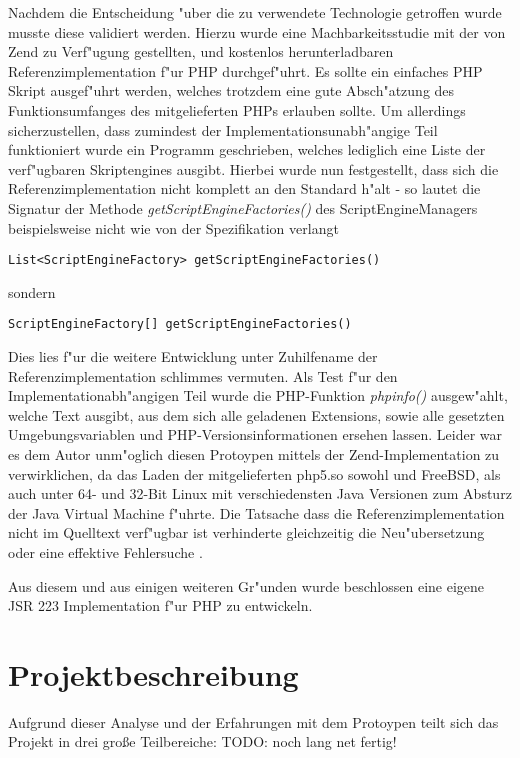 Nachdem die Entscheidung "uber die zu verwendete Technologie getroffen wurde musste diese validiert werden. Hierzu wurde
eine Machbarkeitsstudie mit der von Zend zu Verf"ugung gestellten, und kostenlos herunterladbaren Referenzimplementation
f"ur PHP durchgef"uhrt. Es sollte ein einfaches PHP Skript ausgef"uhrt werden, welches trotzdem eine gute Absch"atzung
des Funktionsumfanges des mitgelieferten PHPs erlauben sollte. Um allerdings sicherzustellen, dass zumindest der 
Implementationsunabh"angige Teil funktioniert wurde ein Programm geschrieben, welches lediglich eine Liste der verf"ugbaren
Skriptengines ausgibt. Hierbei wurde nun festgestellt, dass sich die Referenzimplementation nicht komplett an den Standard
h"alt - so lautet die Signatur der Methode \emph{getScriptEngineFactories()} des ScriptEngineManagers beispielsweise 
nicht wie von der Spezifikation verlangt
\begin{lstlisting}[name=Vom Standard verlangte Signatur]
    List<ScriptEngineFactory> getScriptEngineFactories()
\end{lstlisting}
sondern
\begin{lstlisting}[name=Signatur in der Referenzimplementation]
    ScriptEngineFactory[] getScriptEngineFactories()
\end{lstlisting}
Dies lies f"ur die weitere Entwicklung unter Zuhilfename der Referenzimplementation schlimmes vermuten.
Als Test f"ur den Implementationabh"angigen Teil wurde die PHP-Funktion \emph{phpinfo()} ausgew"ahlt, welche
Text ausgibt, aus dem sich alle geladenen Extensions, sowie alle gesetzten Umgebungsvariablen und 
PHP-Versionsinformationen ersehen lassen. Leider war es dem Autor unm"oglich diesen Protoypen mittels der Zend-Implementation \cite{JSRDL}
zu verwirklichen, da das Laden der mitgelieferten php5.so sowohl und FreeBSD, als auch unter 64- und 32-Bit Linux mit 
verschiedensten Java Versionen zum Absturz der Java Virtual Machine f"uhrte. Die Tatsache dass die Referenzimplementation nicht
im Quelltext verf"ugbar ist verhinderte gleichzeitig die Neu"ubersetzung oder eine effektive Fehlersuche .

Aus diesem und aus einigen weiteren Gr"unden wurde beschlossen eine eigene JSR 223 Implementation f"ur PHP zu entwickeln.

\section{Projektbeschreibung}
\label{sec:chap1:project}

Aufgrund dieser Analyse und der Erfahrungen mit dem Protoypen teilt sich das Projekt in drei gro\ss e Teilbereiche:
TODO: noch lang net fertig!

